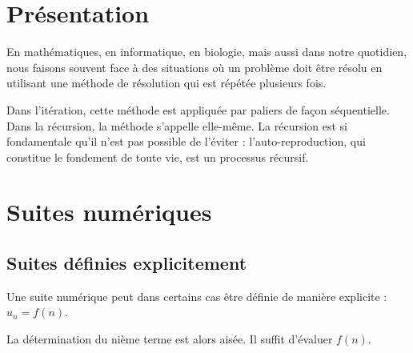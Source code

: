 \documentclass[10pt,fleqn]{article} %
\begin{document}


\section*{Présentation}
\begin{minipage}[c]{.65\linewidth}
En mathématiques, en informatique, en biologie, mais aussi dans notre quotidien, nous faisons souvent face à des situations où un problème doit être résolu en utilisant une méthode de résolution qui est répétée plusieurs fois. 

Dans l'itération, cette méthode est appliquée par paliers de façon séquentielle. Dans la récursion, la méthode s’appelle elle-même. La récursion est si fondamentale qu’il n’est pas possible de l’éviter : l'auto-reproduction, qui constitue le fondement de toute vie, est un processus récursif.
\end{minipage} \hfill
\begin{minipage}[c]{.33\linewidth}
\begin{center}

\end{center}
\end{minipage}

\section{Suites numériques}
\subsection{Suites définies explicitement}

Une suite numérique peut dans certains cas être définie de manière explicite : $u_n = f(n)$.

La détermination du nième terme est alors aisée. Il suffit d’évaluer $f(n)$.
\end{document}
